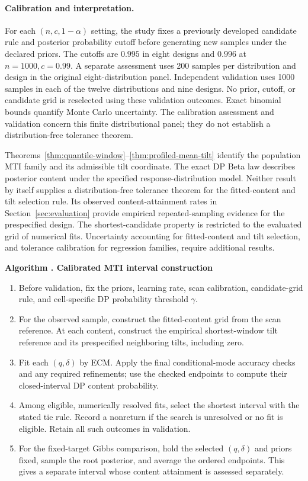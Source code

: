 \documentclass[11pt]{article}
\numberwithin{equation}{section}
\newcounter{algorithm}
\newenvironment{algorithmblock}[1]{%
  \refstepcounter{algorithm}\par\medskip
  \noindent\textbf{Algorithm \thealgorithm. #1}\par
  \begin{enumerate}[leftmargin=2.2em,itemsep=0.3em,parsep=0pt]%
}{%
  \end{enumerate}\par\medskip
}
\begin{document}
\paragraph{Calibration and interpretation.}
For each \((n,c,1-\alpha)\) setting, the study fixes a previously developed
candidate rule and posterior probability cutoff before generating new
samples under the declared priors. The cutoffs are \(0.995\) in eight designs
and \(0.996\) at \(n=1000,c=0.99\). A separate assessment uses 200 samples
per distribution and design in the original eight-distribution panel.
Independent validation uses 1000 samples in each of the twelve distributions
and nine designs.
No prior, cutoff, or candidate grid is reselected using these validation
outcomes. Exact binomial bounds quantify Monte Carlo uncertainty. The
calibration assessment and validation concern this finite distributional
panel; they do not establish a distribution-free tolerance theorem.

Theorems~\ref{thm:quantile-window}--\ref{thm:profiled-mean-tilt} identify
the population MTI family and its admissible tilt coordinate. The exact DP
Beta law describes posterior content under the specified response-distribution
model. Neither result by itself supplies a distribution-free tolerance theorem
for the fitted-content and tilt selection rule. Its observed content-attainment
rates in Section~\ref{sec:evaluation} provide empirical repeated-sampling
evidence for the prespecified design. The shortest-candidate property is
restricted to the evaluated grid of numerical fits. Uncertainty accounting
for fitted-content and tilt selection, and tolerance calibration for regression
families, require additional results.

\begin{algorithmblock}{Calibrated MTI interval construction}
\item Before validation, fix the priors, learning rate, scan calibration,
candidate-grid rule, and cell-specific DP probability threshold \(\gamma\).
\item For the observed sample, construct the fitted-content grid from the
scan reference. At each content, construct the empirical shortest-window
tilt reference and its prespecified neighboring tilts, including zero.
\item Fit each \((q,\delta)\) by ECM. Apply the final conditional-mode
accuracy checks and any required refinements; use the checked endpoints to
compute their closed-interval DP content probability.
\item Among eligible, numerically resolved fits, select the shortest interval
with the stated tie rule. Record a nonreturn if the search is unresolved or
no fit is eligible. Retain all such outcomes in validation.
\item For the fixed-target Gibbs comparison, hold the selected \((q,\delta)\)
and priors fixed, sample the root posterior, and average the ordered endpoints.
This gives a separate interval whose content attainment is assessed separately.
\end{algorithmblock}
\end{document}
